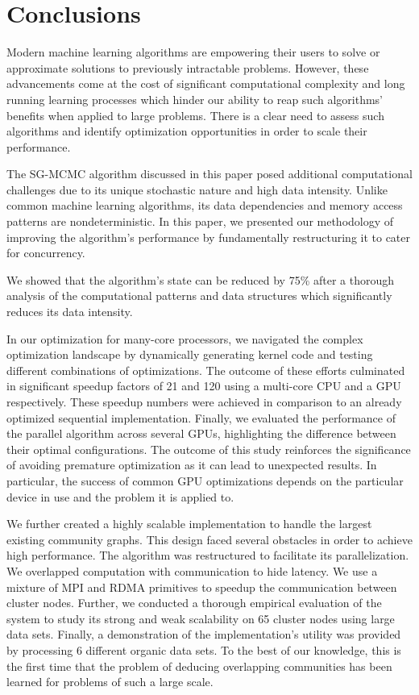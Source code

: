 \section{Conclusions}
\label{sec-conclusion}

Modern machine learning algorithms are empowering their
users to solve or approximate solutions to previously intractable problems.
However, these advancements come at the cost of significant computational
complexity and long running learning processes which hinder our ability to reap
such algorithms' benefits when applied to large problems. There is a clear need
to assess such algorithms and identify optimization opportunities in order to
scale their performance.

The SG-MCMC algorithm discussed in this paper posed additional computational
challenges due to its unique stochastic nature and high data intensity. Unlike
common machine learning algorithms, its data dependencies and memory access
patterns are nondeterministic. In this paper, we presented our methodology of
improving the algorithm's performance by fundamentally restructuring it to
cater for concurrency.

We showed that the algorithm's state can be reduced by 75\% after a thorough
analysis of the computational patterns and data structures which significantly
reduces its data intensity.

In our optimization for many-core processors, we navigated the complex optimization
landscape by dynamically generating kernel code and testing different
combinations of optimizations. The outcome of these efforts culminated in
significant speedup factors of 21 and 120 using a multi-core CPU and a GPU
respectively. These speedup numbers were achieved in comparison to an already
optimized sequential implementation. Finally, we evaluated the performance of
the parallel algorithm across several GPUs, highlighting the difference between
their optimal configurations.
%
The outcome of this study reinforces the significance of avoiding premature
optimization as it can lead to unexpected results. In particular, the success
of common GPU optimizations depends on the particular device in use and the
problem it is applied to.

We further created a highly scalable implementation to handle the largest existing
community graphs.
This design faced
several obstacles in order to achieve high performance.
The algorithm was restructured to facilitate its
parallelization. We overlapped computation
with communication to hide latency.  We use a
mixture of MPI and RDMA primitives to speedup the communication between cluster
nodes.
%
Further, we conducted a thorough empirical evaluation of the system to study its strong
and weak scalability on 65 cluster nodes using large data sets.
Finally, a
demonstration of the implementation's utility was provided by processing 6
different organic data sets.
To the best of
our knowledge, this is the first time that the problem of deducing overlapping
communities has been learned for problems of such a large scale.

